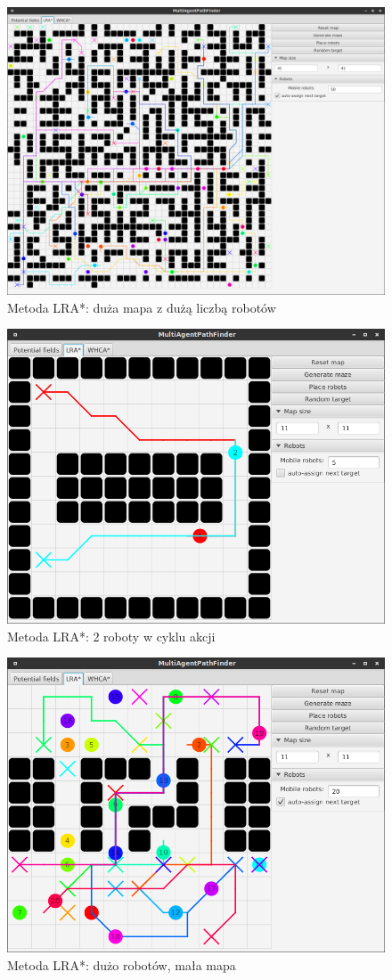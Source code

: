 \begin{figure}
	\centering
	\includegraphics[width=0.8\columnwidth]{img/robopath/lra-bigmap}
	\caption{Metoda LRA*: duża mapa z dużą liczbą robotów}
	\label{fig:app-tech-intellij}
\end{figure}

\begin{figure}
	\centering
	\includegraphics[width=0.8\columnwidth]{img/robopath/lra-cycle}
	\caption{Metoda LRA*: 2 roboty w cyklu akcji}
	\label{fig:app-tech-intellij}
\end{figure}

\begin{figure}
	\centering
	\includegraphics[width=0.8\columnwidth]{img/robopath/lra-lot-robots}
	\caption{Metoda LRA*: dużo robotów, mała mapa}
	\label{fig:app-tech-intellij}
\end{figure}

